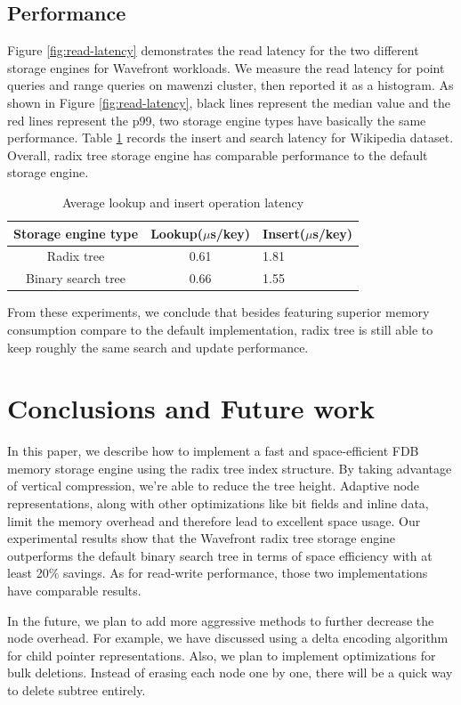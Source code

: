 \documentclass[sigplan,screen,nonacm]{acmart}
\begin{document}
\subsection{Performance}
Figure \ref{fig:read-latency} demonstrates the read latency for the two different storage engines for Wavefront workloads. We measure the read latency for point queries and range queries on mawenzi cluster, then reported it as a histogram. As shown in Figure \ref{fig:read-latency}, black lines represent the median value and the red lines represent the p99, two storage engine types have basically the same performance. Table \ref{tab:wiki-latency} records the insert and search latency for Wikipedia dataset. Overall, radix tree storage engine has comparable performance to the default storage engine. 

\begin{table}[h]
  \caption{Average lookup and insert operation latency}
  \begin{tabular}{ccl}
    \toprule
    Storage engine type&Lookup($\mu$s/key)&Insert($\mu$s/key)\\
    \midrule
    Radix tree & 0.61 & 1.81\\
    Binary search tree & 0.66 & 1.55\\
    \bottomrule
  \end{tabular}
  \label{tab:wiki-latency}
\end{table}

From these experiments, we conclude that besides featuring superior memory consumption compare to the default implementation, radix tree is still able to keep roughly the same search and update performance. 

\section{Conclusions and Future work}
In this paper, we describe how to implement a fast and space-efficient FDB memory storage engine using the radix tree index structure. By taking advantage of vertical compression, we’re able to reduce the tree height. Adaptive node representations, along with other optimizations like bit fields and inline data, limit the memory overhead and therefore lead to excellent space usage. Our experimental results show that the Wavefront radix tree storage engine outperforms the default binary search tree in terms of space efficiency with at least 20\% savings. As for read-write performance, those two implementations have comparable results. 

In the future, we plan to add more aggressive methods to further decrease the node overhead. For example, we have discussed using a delta encoding algorithm for child pointer representations. Also, we plan to implement optimizations for bulk deletions. Instead of erasing each node one by one, there will be a quick way to delete subtree entirely.   



\end{document}
